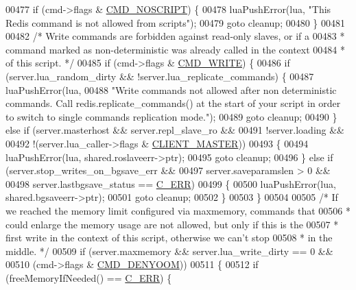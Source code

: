 \begin{DoxyCode}
{{{{{{{00477     \textcolor{keywordflow}{if} (cmd->flags & \hyperlink{server_8h_aaf26ba9b59589bc7701e36fb440a0fbe}{CMD\_NOSCRIPT}) \{
00478         luaPushError(lua, \textcolor{stringliteral}{"This Redis command is not allowed from scripts"});
00479         \textcolor{keywordflow}{goto} cleanup;
00480     \}
00481 
00482     \textcolor{comment}{/* Write commands are forbidden against read-only slaves, or if a}
00483 \textcolor{comment}{     * command marked as non-deterministic was already called in the context}
00484 \textcolor{comment}{     * of this script. */}
00485     \textcolor{keywordflow}{if} (cmd->flags & \hyperlink{server_8h_a7391deb9c3a262ded3e186e94eb884e2}{CMD\_WRITE}) \{
00486         \textcolor{keywordflow}{if} (server.lua\_random\_dirty && !server.lua\_replicate\_commands) \{
00487             luaPushError(lua,
00488                 \textcolor{stringliteral}{"Write commands not allowed after non deterministic commands. Call
       redis.replicate\_commands() at the start of your script in order to switch to single commands replication mode."});
00489             \textcolor{keywordflow}{goto} cleanup;
00490         \} \textcolor{keywordflow}{else} \textcolor{keywordflow}{if} (server.masterhost && server.repl\_slave\_ro &&
00491                    !server.loading &&
00492                    !(server.lua\_caller->flags & \hyperlink{server_8h_a3d8f0cc8d0653ee2b6dafb454292c069}{CLIENT\_MASTER}))
00493         \{
00494             luaPushError(lua, shared.roslaveerr->ptr);
00495             \textcolor{keywordflow}{goto} cleanup;
00496         \} \textcolor{keywordflow}{else} \textcolor{keywordflow}{if} (server.stop\_writes\_on\_bgsave\_err &&
00497                    server.saveparamslen > 0 &&
00498                    server.lastbgsave\_status == \hyperlink{server_8h_af98ac28d5f4d23d7ed5985188e6fb7d1}{C\_ERR})
00499         \{
00500             luaPushError(lua, shared.bgsaveerr->ptr);
00501             \textcolor{keywordflow}{goto} cleanup;
00502         \}
00503     \}
00504 
00505     \textcolor{comment}{/* If we reached the memory limit configured via maxmemory, commands that}
00506 \textcolor{comment}{     * could enlarge the memory usage are not allowed, but only if this is the}
00507 \textcolor{comment}{     * first write in the context of this script, otherwise we can't stop}
00508 \textcolor{comment}{     * in the middle. */}
00509     \textcolor{keywordflow}{if} (server.maxmemory && server.lua\_write\_dirty == 0 &&
00510         (cmd->flags & \hyperlink{server_8h_aef97c640ad8dfdaca21eb67d4c37e447}{CMD\_DENYOOM}))
00511     \{
00512         \textcolor{keywordflow}{if} (freeMemoryIfNeeded() == \hyperlink{server_8h_af98ac28d5f4d23d7ed5985188e6fb7d1}{C\_ERR}) \{
}}}}}}}
\end{DoxyCode}
